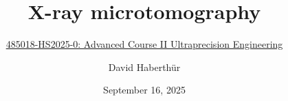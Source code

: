 
\title{X-ray microtomography}
\subtitle{\href{https://ilias.unibe.ch/go/sess/3391298}{485018-HS2025-0: Advanced Course II Ultraprecision Engineering}}
\author{David Haberthür}
\date{September 16, 2025}


\newcommand{\everyframe}{1}%
\newcommand{\imagewidth}{\linewidth}%
\newcommand{\standardimagewidth}{\linewidth}%
\newcommand{\imageheight}{0.72\paperheight}%
\newcommand{\standardimageheight}{0.72\paperheight}%
\newcommand{\uct}{{\textmu}CT\xspace}%
\newcommand{\eg}{e.\,g.\xspace}%
\newcommand{\ie}{i.\,e.\xspace}%

\newlength\imagescale%
\newlength\imgwdtmp%
\newcommand{\setimagescalefrom}[2]{%
  \setlength{\imgwdtmp}{#1}%
  \pgfmathsetlength{\imagescale}{\imgwdtmp/#2}%
}

\usepackage[%
	backend=biber,%
	sorting=none,%
	backref=true,%
	backrefstyle=none,%
	citetracker=true,%
	isbn=false,%
	url=false,%
	maxnames=1,minnames=1,%
	]{biblatex}%

